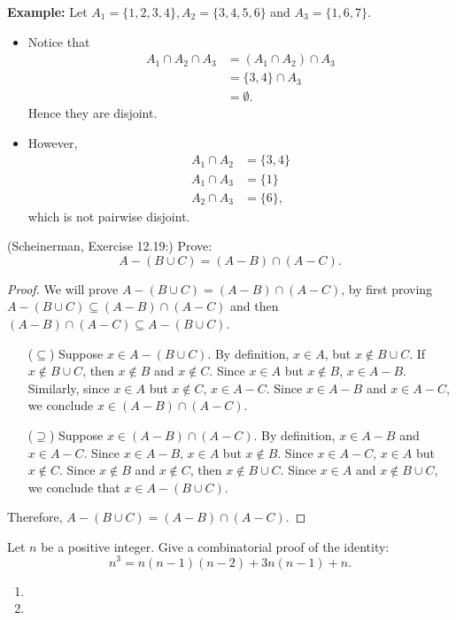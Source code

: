 \documentclass{article}
\theoremstyle{definition}
\begin{document}
\begin{solution}
\textbf{Example:} Let $A_1=\{1, 2, 3, 4\}, A_2=\{3, 4, 5, 6\}$ and $A_3=\{1, 6, 7\}$.
\begin{itemize}
\item Notice that 
\begin{align*}
A_1\cap A_2\cap A_3 &= (A_1\cap A_2)\cap A_3\\
&=\{3,4\}\cap A_3\\
&=\emptyset.
\end{align*} Hence they are disjoint.
\item However,
\begin{align*}
A_1\cap A_2 &=\{3, 4\}\\
A_1\cap A_3 &=\{1\}\\
A_2\cap A_3 &=\{6\},
\end{align*}
which is not pairwise disjoint.
\end{itemize}
\end{solution}


\begin{question}
   (Scheinerman, Exercise 12.19:)
   Prove:
   \[ A-(B\cup C)=(A-B)\cap(A-C).\]
\end{question}
\begin{solution}
\begin{proof}
We will prove $A-(B\cup C) = (A-B)\cap(A-C)$, by first proving $A-(B\cup C) \subseteq (A-B)\cap(A-C)$ and then $(A-B)\cap(A-C)\subseteq A-(B\cup C)$.
\begin{enumerate}
\item[($\subseteq$)] Suppose $x\in A-(B\cup C)$. By definition, $x\in A$, but $x\notin B\cup C$. If $x\notin B\cup C$, then $x\notin B$ and $x\notin C$. Since $x\in A$ but $x\notin B$, $x\in A-B$. Similarly, since $x\in A$ but $x\notin C$, $x\in A-C$. Since $x\in A-B$ and $x\in A-C$, we conclude $x\in (A-B)\cap(A-C)$.

\item [($\supseteq$)] Suppose $x\in (A-B)\cap(A-C)$. By definition, $x\in A-B$ and $x\in A-C$. Since $x\in A-B$, $x\in A$ but $x\notin B$. Since $x\in A-C$, $x\in A$ but $x\notin C$. Since $x\notin B$ and $x\notin C$, then $x\notin B\cup C$. Since $x\in A$ and $x\notin B\cup C$, we conclude that $x\in A-(B\cup C)$.
\end{enumerate}
Therefore, $A-(B\cup C) = (A-B)\cap(A-C)$.
\end{proof}
\end{solution}


\begin{question}
    Let $n$ be a positive integer.  Give a combinatorial proof of the identity:
    \[ n^3 = n(n-1)(n-2) + 3n(n-1) + n. \]
\end{question}
\begin{solution}
    \begin{enumerate}
    \item 
    \item 
    \end{enumerate} 
\end{solution}
\end{document}
